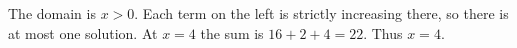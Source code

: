 The domain is $x>0$. Each term on the left is strictly increasing there, so there is at most one solution. At $x=4$ the sum is $16+2+4=22$. Thus $\boxed{x=4}$.

